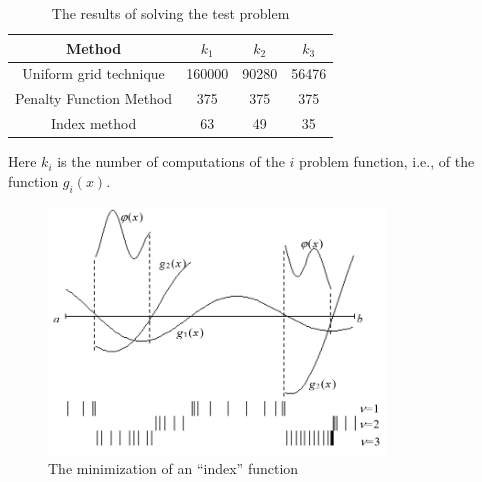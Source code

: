 \begin{table}
  \caption{The results of solving the test problem}
\begin{center}
  \label{tab4:exp_results}
  \begin{tabular}{cccc}
    \hline
    Method & $k_1$ & $k_2$ & $k_3$ \\ \hline
    Uniform grid technique  & 160000 & 90280 & 56476 \\ 
    Penalty Function Method &  375 & 375 & 375 \\ 
    Index method & 63 & 49 & 35 \\ \hline
  \end{tabular}
\end{center}
\end{table}

Here $k_i$ is the number of computations of the $i$ problem function, i.e., of the function $g_i(x )$.
\begin{figure}[ht]
  \centering
  \includegraphics[width=0.8\textwidth]{figures/4_6.png}
  \caption{The minimization of an ``index'' function}
  \label{fig:4_6}
\end{figure}

